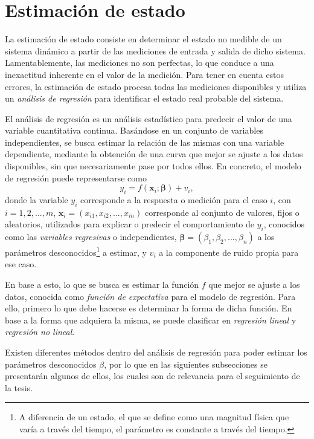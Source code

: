 \section{Estimación de estado}
La estimación de estado consiste en determinar el estado no medible de un sistema dinámico a partir de las mediciones de entrada y salida de dicho sistema. Lamentablemente, las mediciones no son perfectas, lo que conduce a una inexactitud inherente en el valor de la medición. Para tener en cuenta estos errores, la estimación de estado procesa todas las mediciones disponibles y utiliza un \textit{análisis de regresión} para identificar el estado real probable del sistema.

El análisis de regresión es un análisis estadístico para predecir el valor de una variable cuantitativa continua. Basándose en un conjunto de variables independientes, se busca estimar la relación de las mismas con una variable dependiente, mediante la obtención de una curva que mejor se ajuste a los datos disponibles, sin que necesariamente pase por todos ellos. En concreto, el modelo de regresión puede representarse como
\begin{equation}
    y_i = f(\bm{x}_i; \bm{\beta}) + v_i,
    \label{eq:regressionmodel}
\end{equation}
donde la variable $y_i$ corresponde a la respuesta o medición para el caso $i$, con $i = 1, 2, ..., m$, $\bm{x}_i = (x_{i1}, x_{i2}, ..., x_{in})$ corresponde al conjunto de valores, fijos o aleatorios, utilizados para explicar o predecir el comportamiento de $y_i$, conocidos como las \textit{variables regresivas} o independientes, $\bm{\beta} = (\beta_1, \beta_2, ..., \beta_n)$ a los parámetros desconocidos\footnote{A diferencia de un estado, el que se define como una magnitud física que varía a través del tiempo, el parámetro es constante a través del tiempo.} a estimar, y $v_i$ a la componente de ruido propia para ese caso.

En base a esto, lo que se busca es estimar la función $f$ que mejor se ajuste a los datos, conocida como \textit{función de expectativa} para el modelo de regresión. Para ello, primero lo que debe hacerse es determinar la forma de dicha función. En base a la forma que adquiera la misma, se puede clasificar en \textit{regresión lineal} y \textit{regresión no lineal}.

Existen diferentes métodos dentro del análisis de regresión para poder estimar los parámetros desconocidos $\beta$, por lo que en las siguientes subsecciones se presentarán algunos de ellos, los cuales son de relevancia para el seguimiento de la tesis.

